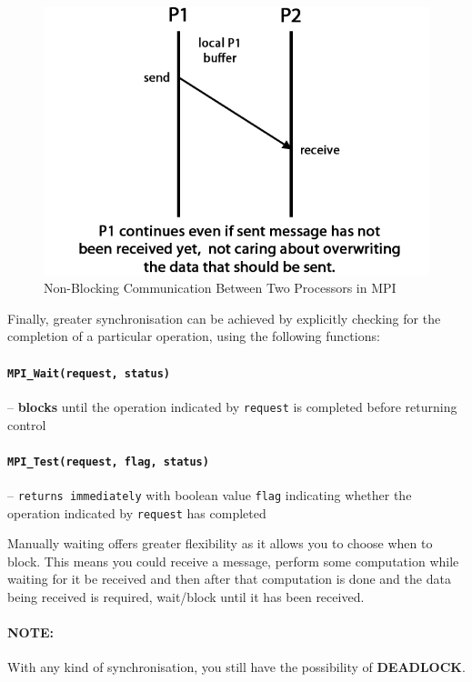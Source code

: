 \documentclass{article}
\begin{document}
\begin{figure}
	\centering
	\includegraphics[scale=0.35]{figures/mpi-notblocking-send.png}
	\caption{Non-Blocking Communication Between Two Processors in MPI}
	\label{fig:non-block-comm}
\end{figure}

Finally, greater synchronisation can be achieved by explicitly checking for the completion of a particular operation, using the following functions:
\paragraph{ \texttt{MPI\_Wait(request, status)}} -- \textbf{blocks} until the operation indicated by \texttt{request} is completed before returning control
\paragraph{ \texttt{MPI\_Test(request, flag, status)}} -- \texttt{returns immediately} with boolean value \texttt{flag} indicating whether the operation indicated by \texttt{request} has completed

Manually waiting offers greater flexibility as it allows you to choose when to block. This means you could receive a message, perform some computation  while waiting for it be received and then after that computation is done and the data being received is required, wait/block until it has been received.

\paragraph{\textbf{NOTE}:} With any kind of synchronisation, you still have the possibility of \textbf{DEADLOCK}.
\end{document}
